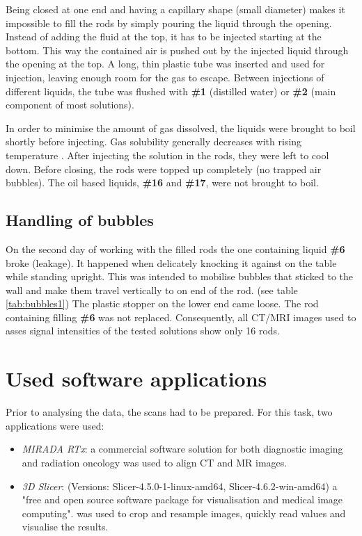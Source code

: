 Being closed at one end and having a capillary shape (small diameter) makes it impossible to fill the rods by simply pouring the liquid through the opening.
Instead of adding the fluid at the top, it has to be injected starting at the bottom.
This way the contained air is pushed out by the injected liquid through the opening at the top.
A long, thin plastic tube was inserted and used for injection, leaving enough room for the gas to escape.
Between injections of different liquids, the tube was flushed with \textbf{\#1} (distilled water) or \textbf{\#2} (main component of most solutions).

In order to minimise the amount of gas dissolved, the liquids were brought to boil shortly before injecting. Gas solubility generally decreases with rising temperature \cite{Henry1803, Sander2015}.
After injecting the solution in the rods, they were left to cool down.
Before closing, the rods were topped up completely (no trapped air bubbles).
The oil based liquids, \textbf{\#16} and \textbf{\#17}, were not brought to boil.

\subsection{Handling of bubbles}

On the second day of working with the filled rods the one containing liquid \textbf{\#6} broke (leakage).
It happened when delicately knocking it against on the table while standing upright.
This was intended to mobilise bubbles that sticked to the wall and make them travel vertically to on end of the rod. (see table \ref{tab:bubbles1})
The plastic stopper on the lower end came loose.
The rod containing filling \textbf{\#6} was not replaced.
Consequently, all CT/MRI images used to asses signal intensities of the tested solutions show only 16 rods.


\section{Used software applications}

Prior to analysing the data, the scans had to be prepared.
For this task, two applications were used:
\begin{itemize}
\item \textit{MIRADA RTx}: a commercial software solution for both diagnostic imaging and radiation oncology \cite{mirada} was used to align CT and MR images.
\item \textit{3D Slicer}: (Versions: Slicer-4.5.0-1-linux-amd64, Slicer-4.6.2-win-amd64) a "free and open source software package for visualisation and medical image computing". \cite{3DSlicer, Kikinis2012} was used to crop and resample images, quickly read values and visualise the results.
\end{itemize}


